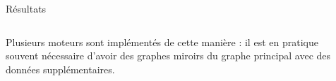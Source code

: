 \begin{columns}[t]
\begin{column}{\onecolwid}
\begin{block}{Résultats}
          	\begin{columns}[t]
          		\begin{column}{\onecolwid}\justify
                      Plusieurs moteurs sont implémentés de cette manière : il est en pratique souvent nécessaire d'avoir des graphes miroirs du graphe principal avec des données supplémentaires.
          		\end{column}
          	\end{columns}        
            \end{block}
        \end{column}         
   \begin{column}{\sepwid}\end{column}		
\end{columns}

